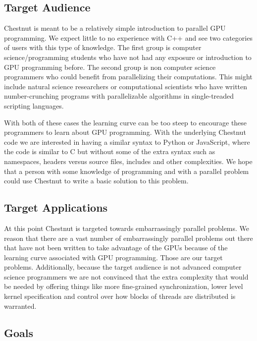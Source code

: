 \documentclass[twocolumn]{article}
\renewcommand{\|}{\origbar} %
\begin{document}
\subsection{Target Audience}
\label{sec:targetaudience}

Chestnut is meant to be a relatively simple introduction to parallel GPU programming. We expect little to no experience with C++ and see two categories of users with this type of knowledge. The first group is computer science/programming students who have not had any exposure or introduction to GPU programming before. The second group is non computer science programmers who could benefit from parallelizing their computations. This might include natural science researchers or computational scientists who have written number-crunching programs with parallelizable algorithms in single-treaded scripting languages.

With both of these cases the learning curve can be too steep to encourage these programmers to learn about GPU programming. With the underlying Chestnut code we are interested in having a similar syntax to Python or JavaScript, where the code is similar to C but without some of the extra syntax such as namespaces, headers versus source files, includes and other complexities. We hope that a person with some knowledge of programming and with a parallel problem could use Chestnut to write a basic solution to this problem.

\subsection{Target Applications}

At this point Chestnut is targeted towards embarrassingly parallel problems. We reason that there are a vast number of embarrassingly parallel problems out there that have not been written to take advantage of the GPUs because of the learning curve associated with GPU programming. Those are our target problems. Additionally, because the target audience is not advanced computer science programmers we are not convinced that the extra complexity that would be needed by offering things like more fine-grained synchronization, lower level kernel specification and control over how blocks of threads are distributed is warranted.

\subsection{Goals}
\end{document}
